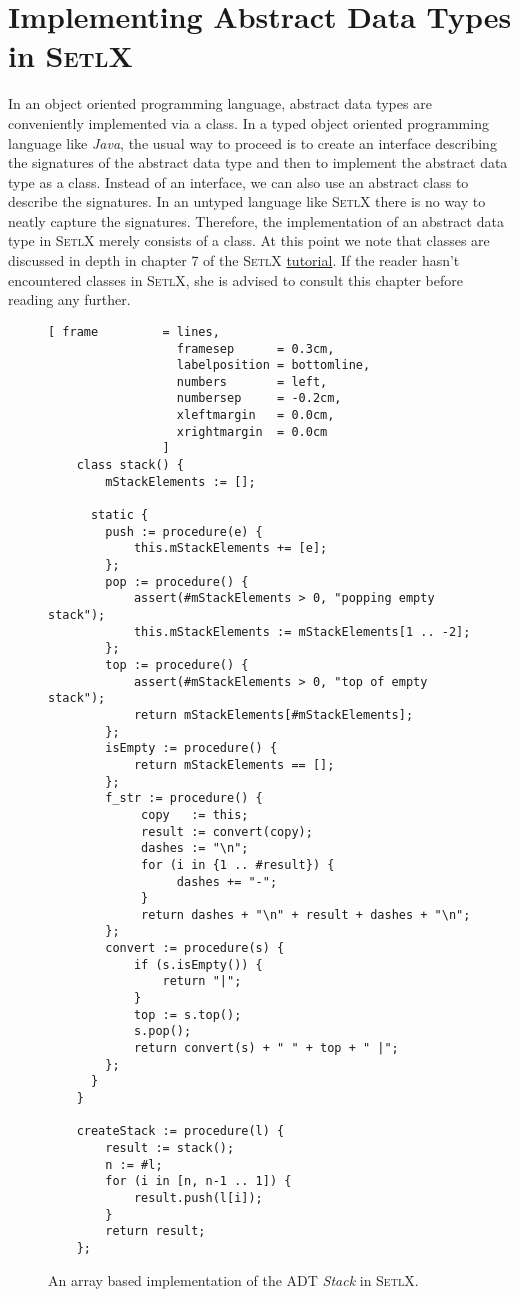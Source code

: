 \section[Implementation]{Implementing Abstract Data Types in \textsc{SetlX}}
In an object oriented programming language, abstract data types are conveniently implemented via a
class.  In a typed object oriented programming language like \textsl{Java}, the usual way to proceed
is to create an interface describing the signatures of the abstract data type and then to implement
the abstract data type as a class.  Instead of an interface, we can also use an abstract class
to describe the signatures.  In an untyped language like \textsc{SetlX} there is no way to
neatly capture the signatures.  Therefore, the implementation of an abstract data type in
\textsc{SetlX} merely consists of a class.
At this point we note that classes are discussed in depth in chapter 7 of the \textsc{SetlX} 
\href{http://wwwlehre.dhbw-stuttgart.de/~stroetma/SetlX/tutorial.pdf}{tutorial}.  If the reader
hasn't encountered classes in \textsc{SetlX}, she is advised to consult this chapter before reading
any further. 

\begin{figure}[!h]
  \centering
\begin{Verbatim}[ frame         = lines, 
                  framesep      = 0.3cm, 
                  labelposition = bottomline,
                  numbers       = left,
                  numbersep     = -0.2cm,
                  xleftmargin   = 0.0cm,
                  xrightmargin  = 0.0cm
                ]
    class stack() {
        mStackElements := [];
    
      static {  
        push := procedure(e) {
            this.mStackElements += [e];
        };
        pop := procedure() {
            assert(#mStackElements > 0, "popping empty stack");
            this.mStackElements := mStackElements[1 .. -2];
        };
        top := procedure() {
            assert(#mStackElements > 0, "top of empty stack");
            return mStackElements[#mStackElements];
        };
        isEmpty := procedure() {
            return mStackElements == [];
        };
        f_str := procedure() {
             copy   := this;
             result := convert(copy);
             dashes := "\n";
             for (i in {1 .. #result}) {
                  dashes += "-";
             }
             return dashes + "\n" + result + dashes + "\n";
        };
        convert := procedure(s) {
            if (s.isEmpty()) {
                return "|";
            } 
            top := s.top();
            s.pop();
            return convert(s) + " " + top + " |";
        };
      }
    }
    
    createStack := procedure(l) {
        result := stack();
        n := #l;
        for (i in [n, n-1 .. 1]) {
            result.push(l[i]);
        }
        return result;
    };
\end{Verbatim}
\vspace*{-0.3cm}
  \caption{An array based implementation of the ADT \textsl{Stack} in \textsc{SetlX}.}
  \label{fig:stack-array.stlx}
\end{figure} 

